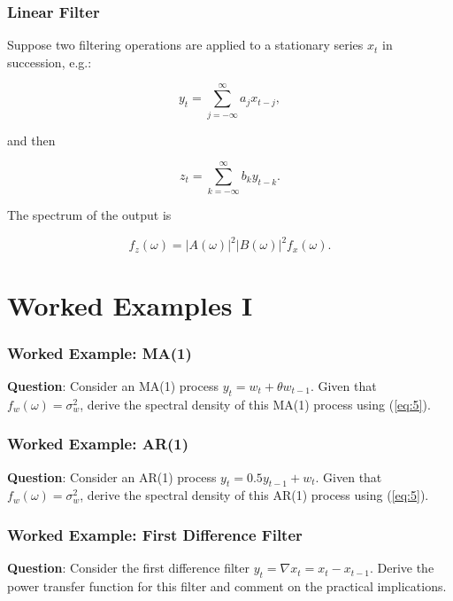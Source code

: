 \documentclass[%
xcolor=pdftex]{beamer}
\begin{document}
\begin{frame}
\frametitle{Linear Filter}

Suppose two filtering operations are applied to a stationary series $x_t$ in succession, e.g.:

$$
y_t = \sum_{j=-\infty}^{\infty} a_j x_{t-j},
$$

and then

$$
z_t = \sum_{k=-\infty}^{\infty} b_k y_{t-k}.
$$

The spectrum of the output is

$$
f_z(\omega) = |A(\omega)|^2 |B(\omega)|^2 f_x(\omega).
$$

\end{frame}

\section{Worked Examples I}
\frame{\tableofcontents[currentsection]}

\begin{frame}
\frametitle{Worked Example: MA(1)}

\textbf{Question}: Consider an MA(1) process $y_t = w_t + \theta w_{t-1}$. Given that $f_w(\omega) = \sigma_w^2$, derive the spectral density of this MA(1) process using (\ref{eq:5}).

\vspace{50mm}

\end{frame}

\begin{frame}
\frametitle{Worked Example: AR(1)}

\textbf{Question}: Consider an AR(1) process $y_t = 0.5 y_{t-1} + w_{t}$. Given that $f_w(\omega) = \sigma_w^2$, derive the spectral density of this AR(1) process using (\ref{eq:5}).

\vspace{50mm}

\end{frame}

\begin{frame}
\frametitle{Worked Example: First Difference Filter}

\textbf{Question}: Consider the first difference filter $y_t = \nabla x_t = x_t - x_{t-1}$. Derive the power transfer function for this filter and comment on the practical implications.

\vspace{50mm}

\end{frame}
\end{document}
